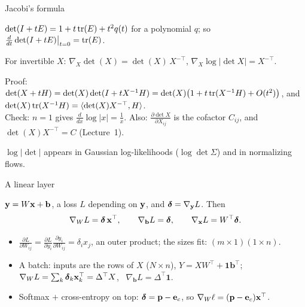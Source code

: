 \documentclass[aspectratio=1610,11pt]{beamer}
\begin{document}
\begin{frame}{Jacobi's formula}
    \begin{lemma}
        \small $\det(I + tE) = 1 + t\operatorname{tr}(E) + t^2q(t)$ for a polynomial $q$; so $\frac{d}{dt}\det(I + tE)\big|_{t=0} = \operatorname{tr}(E)$.
    \end{lemma}
    \begin{proposition}
        \small For invertible $X$: \quad $\nabla_X\det(X) = \det(X)\,X^{-\top}$, \qquad $\nabla_X\log|\det X| = X^{-\top}$.
    \end{proposition}
    \small
    Proof: $\det(X + tH) = \det(X)\det(I + tX^{-1}H) = \det(X)\big(1 + t\operatorname{tr}(X^{-1}H) + O(t^2)\big)$, and $\det(X)\operatorname{tr}(X^{-1}H) = \langle \det(X)X^{-\top}, H \rangle$.
    \\[0.3em]
    Check: $n = 1$ gives $\frac{d}{dx}\log|x| = \frac{1}{x}$. Also: $\frac{\partial\det X}{\partial X_{ij}}$ is the cofactor $C_{ij}$, and $\det(X)X^{-\top} = C$ (Lecture~1).
    \begin{mlbox}
        \small $\log|\det|$ appears in Gaussian log-likelihoods ($\log\det\Sigma$) and in normalizing flows.
    \end{mlbox}
\end{frame}

\begin{frame}{A linear layer}
    \begin{example}
        \small $\mathbf{y} = W\mathbf{x} + \mathbf{b}$, a loss $L$ depending on $\mathbf{y}$, and $\boldsymbol{\delta} = \nabla_{\mathbf{y}}L$. Then
        \[\nabla_W L = \boldsymbol{\delta}\,\mathbf{x}^\top, \qquad \nabla_{\mathbf{b}}L = \boldsymbol{\delta}, \qquad \nabla_{\mathbf{x}}L = W^\top\boldsymbol{\delta}.\]
    \end{example}
    \small
    \begin{itemize}
        \item $\frac{\partial L}{\partial W_{ij}} = \frac{\partial L}{\partial y_i}\frac{\partial y_i}{\partial W_{ij}} = \delta_ix_j$, an outer product; the sizes fit: $(m \times 1)(1 \times n)$.
        \item A batch: inputs are the rows of $X$ ($N \times n$), $Y = XW^\top + \mathbf{1}\mathbf{b}^\top$; \ $\nabla_W L = \sum_k\boldsymbol{\delta}_k\mathbf{x}_k^\top = \Delta^\top X$, \ $\nabla_{\mathbf{b}}L = \Delta^\top\mathbf{1}$.
        \item Softmax $+$ cross-entropy on top: $\boldsymbol{\delta} = \mathbf{p} - \mathbf{e}_c$, so $\nabla_W\ell = (\mathbf{p} - \mathbf{e}_c)\mathbf{x}^\top$.
    \end{itemize}
\end{frame}
\end{document}
